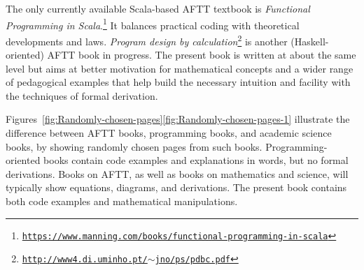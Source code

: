 The only currently available Scala-based AFTT textbook is \emph{Functional
Programming in Scala}.\footnote{\texttt{\href{https://www.manning.com/books/functional-programming-in-scala}{https://www.manning.com/books/functional-programming-in-scala}}}
It balances practical coding with theoretical developments and laws.
\emph{Program design by calculation}\footnote{\texttt{\href{http://www4.di.uminho.pt/~jno/ps/pdbc.pdf}{http://www4.di.uminho.pt/$\sim$jno/ps/pdbc.pdf}}}
is another (Haskell-oriented) AFTT book in progress. The present book
is written at about the same level but aims at better motivation for
mathematical concepts and a wider range of pedagogical examples that
help build the necessary intuition and facility with the techniques
of formal derivation. 

Figures~\ref{fig:Randomly-chosen-pages}\textendash \ref{fig:Randomly-chosen-pages-1}
illustrate the difference between AFTT books, programming books, and
academic science books, by showing randomly chosen pages from such
books. Programming-oriented books contain code examples and explanations
in words, but no formal derivations. Books on AFTT, as well as books
on mathematics and science, will typically show equations, diagrams,
and derivations. The present book contains both code examples and
mathematical manipulations.

